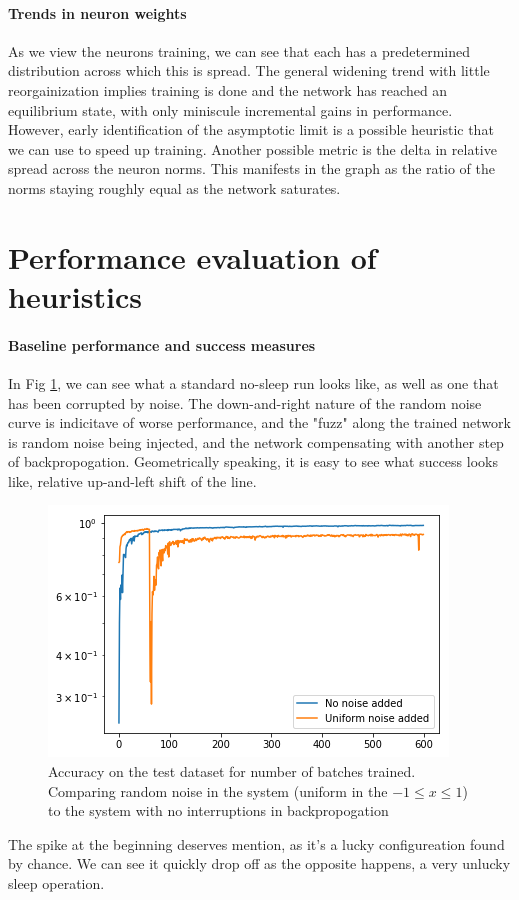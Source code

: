\documentclass[a1,landscape]{a0poster}
\begin{document}
\begin{multicols}{4}
        \paragraph{Trends in neuron weights} As we view the neurons training, we can see that each has a predetermined distribution across which this is spread. The general widening trend with little reorgainization implies training is done and the network has reached an equilibrium state, with only miniscule incremental gains in performance.
        However, early identification of the asymptotic limit is a possible heuristic that we can use to speed up training.
        Another possible metric is the delta in relative spread across the neuron norms. This manifests in the graph as the ratio of the norms staying roughly equal as the network saturates.
        
    \section*{Performance evaluation of heuristics}
    \paragraph{Baseline performance and success measures}
    In Fig \ref{fig:noisevsnormal}, we can see what a standard no-sleep run looks like, as well as one that has been corrupted by noise. The down-and-right nature of the random noise curve is indicitave of worse performance, and the "fuzz" along the trained network is random noise being injected, and the network compensating with another step of backpropogation.
    Geometrically speaking, it is easy to see what success looks like, relative up-and-left shift of the line.
    \small
    \begin{figure}[H]
    	\centering
    	\includegraphics[width=0.6\linewidth]{img/noise_vs_normal}
    	\caption{ Accuracy on the test dataset for number of batches trained. Comparing random noise in the system (uniform in the $-1 \leq x \leq 1$) to the system with no interruptions in backpropogation}
    	\label{fig:noisevsnormal}
    \end{figure}
  \small
  The spike at the beginning deserves mention, as it's a lucky configureation found by chance. We can see it quickly drop off as the opposite happens, a very unlucky sleep operation.
  

\end{multicols}
\end{document}

